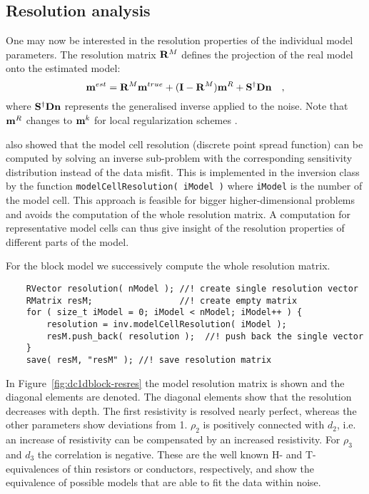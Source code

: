 \subsection{Resolution analysis}\label{sec:dc1dresolution}
One may now be interested in the resolution properties of the individual model parameters.
The resolution matrix ${\mathbf{R}}^M$ defines the projection of the real model onto the estimated model:
\begin{equation}
	\mathbf{m}^{est} = {\mathbf{R}}^M \mathbf{m}^{true} + (\mathbf{I} - {\mathbf{R}}^M) \mathbf{m}^R + \mathbf{S}^\dagger\mathbf{D}\mathbf{n}\quad,
\end{equation}
\citep{guentherdiss} where $\mathbf{S}^\dagger\mathbf{D}\mathbf{n}$ represents the generalised inverse applied to the noise.
Note that $\mathbf{m}^R$ changes to $\mathbf{m}^k$ for local regularization schemes \citep{friedel03}.

\citet{guentherdiss} also showed that the model cell resolution (discrete point spread function) can be computed by solving an inverse sub-problem with the corresponding sensitivity distribution instead of the data misfit.
This is implemented in the inversion class by the function \lstinline|modelCellResolution( iModel )| where \lstinline|iModel| is the number of the model cell.
This approach is feasible for bigger higher-dimensional problems and avoids the computation of the whole resolution matrix.
A computation for representative model cells can thus give insight of the resolution properties of different parts of the model.

For the block model we successively compute the whole resolution matrix.
\begin{lstlisting}
    RVector resolution( nModel ); //! create single resolution vector
    RMatrix resM;                 //! create empty matrix 
    for ( size_t iModel = 0; iModel < nModel; iModel++ ) {
        resolution = inv.modelCellResolution( iModel );
        resM.push_back( resolution );  //! push back the single vector
    }
    save( resM, "resM" ); //! save resolution matrix
\end{lstlisting}

In Figure~\ref{fig:dc1dblock-resres} the model resolution matrix is shown and the diagonal elements are denoted.
The diagonal elements show that the resolution decreases with depth.
The first resistivity is resolved nearly perfect, whereas the other parameters show deviations from 1.
$\rho_2$ is positively connected with $d_2$, i.e. an increase of resistivity can be compensated by an increased resistivity.
For $\rho_3$ and $d_3$ the correlation is negative.
These are the well known H- and T-equivalences of thin resistors or conductors, respectively, and show the equivalence of possible models that are able to fit the data within noise.

